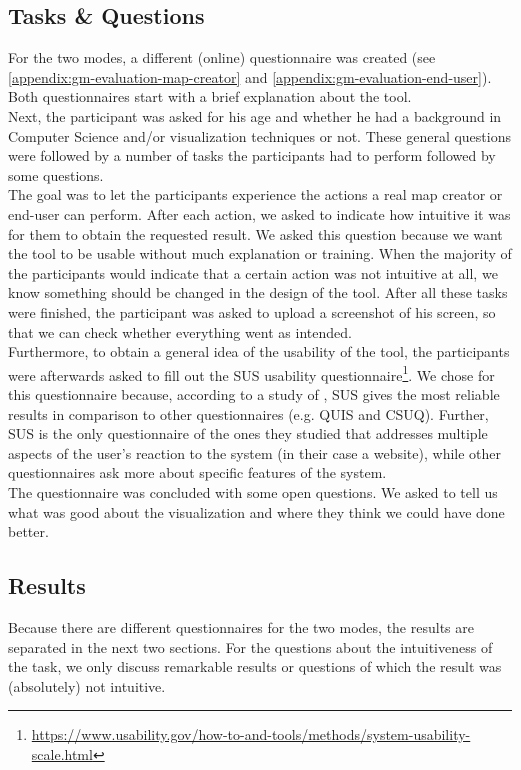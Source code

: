 \subsection{Tasks \& Questions}
For the two modes, a different (online) questionnaire was created (see \autoref{appendix:gm-evaluation-map-creator} and \autoref{appendix:gm-evaluation-end-user}). Both questionnaires start with a brief explanation about the tool.\\

Next, the participant was asked for his age and whether he had a background in Computer Science and/or visualization techniques or not. These general questions were followed by a number of tasks the participants had to perform followed by some questions.\\

The goal was to let the participants experience the actions a real map creator or end-user can perform. After each action, we asked to indicate how intuitive it was for them to obtain the requested result. We asked this question because we want the tool to be usable without much explanation or training. When the majority of the participants would indicate that a certain action was not intuitive at all, we know something should be changed in the design of the tool. After all these tasks were finished, the participant was asked to upload a screenshot of his screen, so that we can check whether everything went as intended.\\

Furthermore, to obtain a general idea of the usability of the tool, the participants were afterwards asked to fill out the SUS usability questionnaire\footnote{\url{https://www.usability.gov/how-to-and-tools/methods/system-usability-scale.html}}. We chose for this questionnaire because, according to a study of \cite{tullis2004comparison}, SUS gives the most reliable results in comparison to other questionnaires (e.g. QUIS and CSUQ). Further, SUS is the only questionnaire of the ones they studied that addresses multiple aspects of the user's reaction to the system (in their case a website), while other questionnaires ask more about specific features of the system.\\

The questionnaire was concluded with some open questions. We asked to tell us what was good about the visualization and where they think we could have done better.

\subsection{Results}
Because there are different questionnaires for the two modes, the results are separated in the next two sections. For the questions about the intuitiveness of the task, we only discuss remarkable results or questions of which the result was (absolutely) not intuitive.

